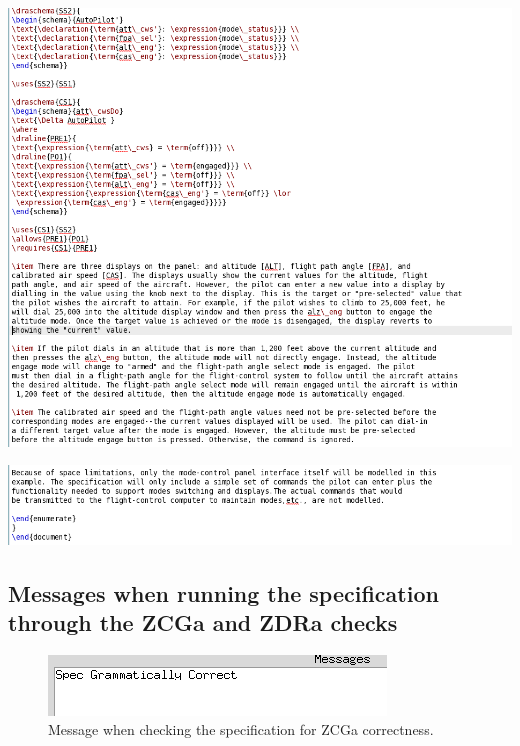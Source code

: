 \noindent \includegraphics[scale=0.5]{examples/semiform/1n2b.png}

\noindent \includegraphics[scale=0.5]{examples/semiform/1n2c.png}
%

%


\subsection{Messages when running the specification through the ZCGa and ZDRa checks}

\begin{figure}[H]
\includegraphics[scale=0.7]{examples/semiform/zcgacorrect.png}
\caption{Message when checking the specification for ZCGa correctness.}
\end{figure}

